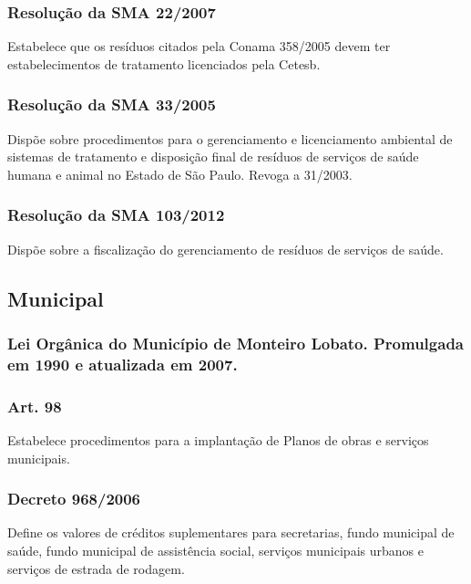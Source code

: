 \begin{subapend}
\begin{subsubapend}
		\subsubsection{Resolução da SMA 22/2007}
		Estabelece que os resíduos citados pela Conama 358/2005 devem ter estabelecimentos de tratamento licenciados pela Cetesb.
		\subsubsection{Resolução da SMA 33/2005}
		Dispõe sobre procedimentos para o gerenciamento e licenciamento ambiental de sistemas de tratamento e disposição final de resíduos de serviços de saúde humana e animal no Estado de São Paulo. Revoga a 31/2003.
		\subsubsection{Resolução da SMA 103/2012}
		Dispõe sobre a fiscalização do gerenciamento de resíduos de serviços de saúde.
	\end{subsubapend}
\end{subapend}


\begin{subapend}
	\subsection{Municipal}
	\begin{subsubapend}
		\subsubsection{Lei Orgânica do Município de Monteiro Lobato. Promulgada em 1990 e atualizada em 2007.}
		\subsubsection{Art. 98}
		Estabelece procedimentos para a implantação de Planos de obras e serviços municipais.
		\subsubsection{Decreto 968/2006}
		Define os valores de créditos suplementares para secretarias, fundo municipal de saúde, fundo municipal de assistência social, serviços municipais urbanos e serviços de estrada de rodagem.
	\end{subsubapend}
\end{subapend}


